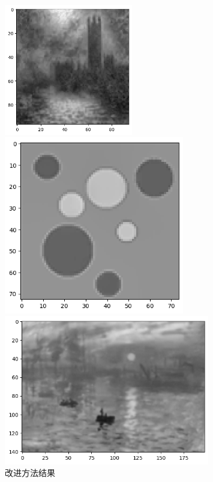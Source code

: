 \documentclass{article}
\begin{document}
\begin{figure}[htbp]
	\centering
		\begin{minipage}[c]{0.3\textwidth} %
			\centering
			\includegraphics[width=0.5\textwidth]{./report/output1.png} %
			
		\end{minipage}%
		\begin{minipage}[c]{0.2\textwidth}
			\centering
			\includegraphics[width=0.7\textwidth]{./report/output2.png}
			
		\end{minipage}
		\begin{minipage}[c]{0.2\textwidth}
			\centering
			\includegraphics[width=0.8\textwidth]{./report/output3.png}
			
		\end{minipage}
		\caption*{改进方法结果}
\end{figure}
\end{document}
